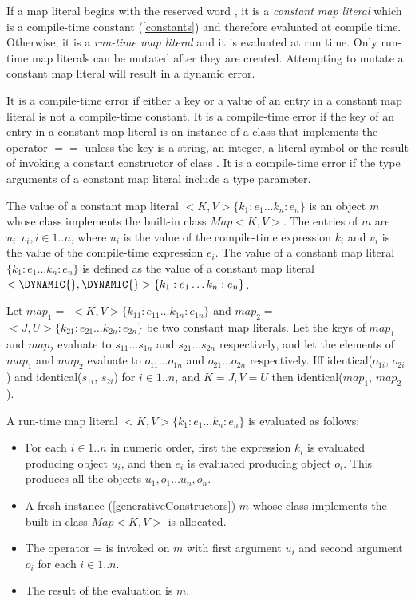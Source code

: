 \documentclass{article}
\newcommand{\code}[1]{{\sf #1}}
\begin{document}
\LMHash{}
If a map literal begins with the reserved word \CONST{}, it is a {\em constant map literal} which is a compile-time constant (\ref{constants}) and therefore evaluated at compile time. Otherwise, it is a {\em run-time map literal} and it is evaluated at run time. Only run-time map literals can be mutated
after they are created. Attempting to mutate a constant map literal will result in a dynamic error.

\LMHash{}
It is a compile-time error if either a key or a value of an entry in a constant map literal is not a compile-time constant. It is a compile-time error if the key of an entry in a constant map literal is an instance of a class that implements the operator $==$ unless the key is a
string, an integer, a literal symbol or the result of invoking a constant constructor of class .
It is a compile-time error if the type arguments of a constant map literal include a type parameter.

\LMHash{}
The value of a constant map literal  \CONST{}$ <K, V>\{k_1:e_1\ldots k_n :e_n\}$ is an object $m$ whose class implements the built-in class $Map<K, V>$. The entries of $m$ are $u_i:v_i, i \in 1 .. n$, where $u_i$ is the value of the compile-time expression $k_i$ and $v_i$ is the value of the compile-time expression $e_i$.  The value of a constant map literal  \CONST{} $\{k_1:e_1\ldots k_n :e_n\}$ is defined as the value of a constant map literal \CONST{} $<\DYNAMIC{}, \DYNAMIC{}>\{k_1:e_1\ldots k_n :e_n\}$.

\LMHash{}
Let $map_1 =$ \CONST{}$ <K, V>\{k_{11}:e_{11} \ldots k_{1n} :e_{1n}\}$ and  $map_2 =$  \CONST{}$ <J, U>\{k_{21}:e_{21} \ldots k_{2n} :e_{2n}\}$ be two constant map literals. Let the keys of $map_1$ and $map_2$ evaluate to  $s_{11} \ldots  s_{1n}$  and   $s_{21} \ldots  s_{2n}$ respectively, and let the elements of $map_1$ and $map_2$ evaluate to $o_{11} \ldots  o_{1n}$ and $o_{21} \ldots  o_{2n}$ respectively. Iff \code{identical($o_{1i}$, $o_{2i}$)}  and \code{identical($s_{1i}$, $s_{2i}$)} for $i \in 1.. n$, and $K = J, V = U$ then \code{identical($map_1$, $map_2$)}.


\LMHash{}
A run-time map literal $<K, V>\{k_1:e_1\ldots k_n :e_n\}$  is evaluated as follows:
\begin{itemize}
\item
For each $i \in 1..n$ in numeric order,
first the expression $k_i$ is evaluated producing object $u_i$,
and then $e_i$ is evaluated producing object $o_i$.
This produces all the objects $u_1, o_1\ldots u_n, o_n$.
\item  A fresh instance (\ref{generativeConstructors}) $m$ whose class implements the built-in class $Map<K, V>$ is allocated.
\item
The operator \code{[]=} is invoked on $m$ with  first  argument $u_i$ and second argument $o_i$ for each $i \in 1.. n$.
\item
The result of the evaluation is $m$.
\end{itemize}
\end{document}
